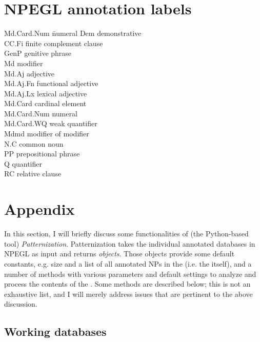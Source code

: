 \documentclass[output=paper,colorlinks,citecolor=brown,draft]{langscibook}
\begin{document}
\section*{NPEGL annotation labels}
\begin{tabbing}
Md.Card.Num \= numeral\kill
Dem \> {demonstrative} \\
CC.Fi \> finite complement clause \\
GenP \> {genitive} phrase \\
Md \> modifier \\
Md.Aj \> {adjective} \\
Md.Aj.Fn \> functional {adjective} \\
Md.Aj.Lx \> lexical {adjective} \\
Md.Card \> cardinal element \\
Md.Card.Num \> {numeral} \\
Md.Card.WQ \> weak {quantifier} \\
Mdmd \> modifier of modifier \\
N.C \> {common noun} \\
PP \> prepositional phrase \\
Q \> {quantifier} \\
RC \> {relative clause} \\
\end{tabbing}


\section*{Appendix}
\label{sec:APP} 

\begin{sloppypar}
In this section, I will briefly discuss some functionalities of (the Python-based tool)  \textit{Patternization}.  {Patternization} takes the individual annotated databases in NPEGL as input and returns \textit{ objects}. Those objects provide some default constants, e.g.  size and a list of all annotated NPs in the  (i.e. the  itself), and a number of methods with various parameters and default settings to analyze and process the contents of the . Some methods are described below; this is not an exhaustive list, and I will merely address issues that are pertinent to the above discussion. 
\end{sloppypar}


\subsection*{Working databases}
\end{document}
